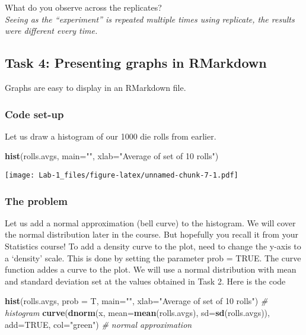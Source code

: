 \documentclass[
]{article}
\newenvironment{Shaded}{\begin{snugshade}}{\end{snugshade}}
\newcommand{\CommentTok}[1]{\textcolor[rgb]{0.56,0.35,0.01}{\textit{#1}}}
\newcommand{\DataTypeTok}[1]{\textcolor[rgb]{0.13,0.29,0.53}{#1}}
\newcommand{\KeywordTok}[1]{\textcolor[rgb]{0.13,0.29,0.53}{\textbf{#1}}}
\newcommand{\NormalTok}[1]{#1}
\newcommand{\OtherTok}[1]{\textcolor[rgb]{0.56,0.35,0.01}{#1}}
\newcommand{\StringTok}[1]{\textcolor[rgb]{0.31,0.60,0.02}{#1}}
\begin{document}
What do you observe across the replicates?\\
\emph{Seeing as the ``experiment'' is repeated multiple times using
replicate, the results were different every time.}

\hypertarget{task-4-presenting-graphs-in-rmarkdown}{%
\subsection{Task 4: Presenting graphs in
RMarkdown}\label{task-4-presenting-graphs-in-rmarkdown}}

Graphs are easy to display in an RMarkdown file.

\hypertarget{code-set-up-2}{%
\subsubsection{Code set-up}\label{code-set-up-2}}

Let us draw a histogram of our 1000 die rolls from earlier.

\begin{Shaded}
\begin{Highlighting}[]
\KeywordTok{hist}\NormalTok{(rolls.avgs, }\DataTypeTok{main=}\StringTok{""}\NormalTok{, }\DataTypeTok{xlab=}\StringTok{"Average of set of 10 rolls"}\NormalTok{)}
\end{Highlighting}
\end{Shaded}

\texttt{[image: Lab-1\_files/figure-latex/unnamed-chunk-7-1.pdf]}

\hypertarget{the-problem-2}{%
\subsubsection{The problem}\label{the-problem-2}}

Let us add a normal approximation (bell curve) to the histogram. We will
cover the normal distribution later in the course. But hopefully you
recall it from your Statistics course! To add a density curve to the
plot, need to change the y-axis to a `density' scale. This is done by
setting the parameter prob = TRUE. The curve function addes a curve to
the plot. We will use a normal distribution with mean and standard
deviation set at the values obtained in Task 2. Here is the code

\begin{Shaded}
\begin{Highlighting}[]
\KeywordTok{hist}\NormalTok{(rolls.avgs, }\DataTypeTok{prob =}\NormalTok{ T, }\DataTypeTok{main=}\StringTok{""}\NormalTok{, }\DataTypeTok{xlab=}\StringTok{"Average of set of 10 rolls"}\NormalTok{) }\CommentTok{# histogram}
\KeywordTok{curve}\NormalTok{(}\KeywordTok{dnorm}\NormalTok{(x, }\DataTypeTok{mean=}\KeywordTok{mean}\NormalTok{(rolls.avgs), }\DataTypeTok{sd=}\KeywordTok{sd}\NormalTok{(rolls.avgs)), }\DataTypeTok{add=}\OtherTok{TRUE}\NormalTok{, }\DataTypeTok{col=}\StringTok{"green"}\NormalTok{) }\CommentTok{# normal approximation}
\end{Highlighting}
\end{Shaded}
\end{document}
